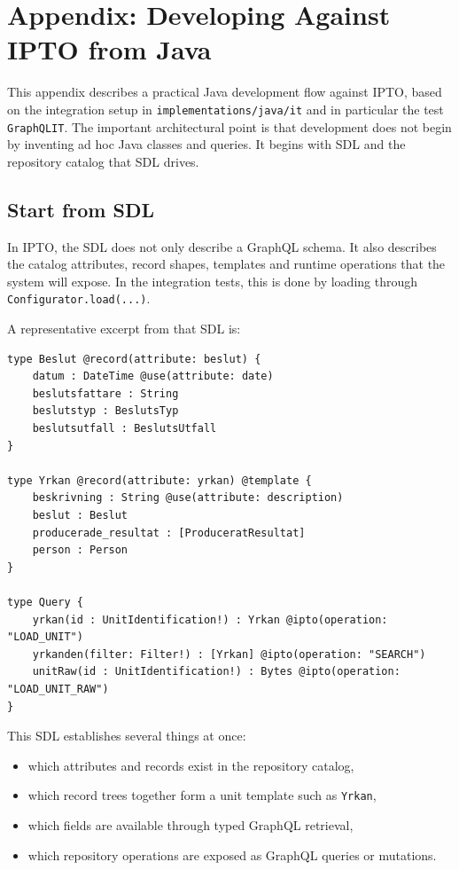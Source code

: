 \section{Appendix: Developing Against IPTO from Java}
\label{sec:AppendixJavaApi}

This appendix describes a practical Java development flow against IPTO, based on the integration setup in \texttt{implementations/java/it} and in particular the test \texttt{GraphQLIT}. The important architectural point is that development does not begin by inventing ad hoc Java classes and queries. It begins with SDL and the repository catalog that SDL drives.

\subsection{Start from SDL}

In IPTO, the SDL does not only describe a GraphQL schema. It also describes the catalog attributes, record shapes, templates and runtime operations that the system will expose. In the integration tests, this is done by loading  through \texttt{Configurator.load(...)}.

A representative excerpt from that SDL is:

\begin{lstlisting}[style=GraphQL]
type Beslut @record(attribute: beslut) {
    datum : DateTime @use(attribute: date)
    beslutsfattare : String
    beslutstyp : BeslutsTyp
    beslutsutfall : BeslutsUtfall
}

type Yrkan @record(attribute: yrkan) @template {
    beskrivning : String @use(attribute: description)
    beslut : Beslut
    producerade_resultat : [ProduceratResultat]
    person : Person
}

type Query {
    yrkan(id : UnitIdentification!) : Yrkan @ipto(operation: "LOAD_UNIT")
    yrkanden(filter: Filter!) : [Yrkan] @ipto(operation: "SEARCH")
    unitRaw(id : UnitIdentification!) : Bytes @ipto(operation: "LOAD_UNIT_RAW")
}
\end{lstlisting}

This SDL establishes several things at once:
\begin{itemize}
\item which attributes and records exist in the repository catalog,
\item which record trees together form a unit template such as \texttt{Yrkan},
\item which fields are available through typed GraphQL retrieval,
\item which repository operations are exposed as GraphQL queries or mutations.
\end{itemize}

